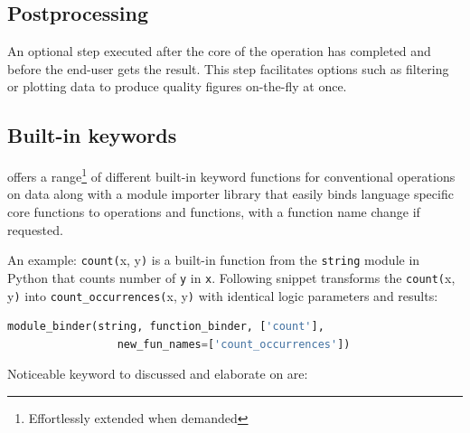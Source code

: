 \subsection{Postprocessing}
An optional step executed after the core of the operation has completed and before the end-user gets the result. This step facilitates options such as filtering or plotting data to produce quality figures on-the-fly at once.

\subsection{Built-in keywords}
\CodeName offers a range\footnote{Effortlessly extended when demanded} of different built-in keyword functions for conventional operations on data along with a module importer library that easily binds language specific core functions to \CodeName operations and functions, with a function name change if requested.

An example: \texttt{count(}x, y\texttt{)} is a built-in function from the \texttt{string} module in Python \cite{PagePython} that counts number of \texttt{y} in \texttt{x}. Following snippet transforms the \texttt{count(}x, y\texttt{)} into \texttt{count\_occurrences(}x, y\texttt{)} with identical logic parameters and results:
\vspace*{2mm}
\begin{lstlisting}[language=Python, basicstyle=\footnotesize, numbers=none, showtabs=false, showstringspaces=false, showspaces=false, otherkeywords={string,new_fun_names}, stringstyle=\color{blue}]
   module_binder(string, function_binder, ['count'], 
                 new_fun_names=['count_occurrences'])
\end{lstlisting}

Noticeable keyword to discussed and elaborate on are:
\vspace*{2mm}

